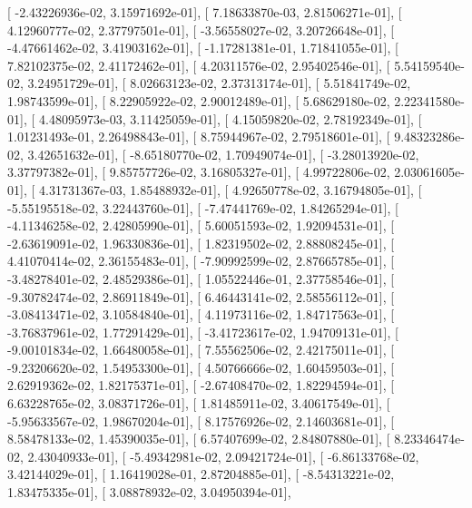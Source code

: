 \documentclass{article}
\begin{document}
       [ -2.43226936e-02,   3.15971692e-01],
       [  7.18633870e-03,   2.81506271e-01],
       [  4.12960777e-02,   2.37797501e-01],
       [ -3.56558027e-02,   3.20726648e-01],
       [ -4.47661462e-02,   3.41903162e-01],
       [ -1.17281381e-01,   1.71841055e-01],
       [  7.82102375e-02,   2.41172462e-01],
       [  4.20311576e-02,   2.95402546e-01],
       [  5.54159540e-02,   3.24951729e-01],
       [  8.02663123e-02,   2.37313174e-01],
       [  5.51841749e-02,   1.98743599e-01],
       [  8.22905922e-02,   2.90012489e-01],
       [  5.68629180e-02,   2.22341580e-01],
       [  4.48095973e-03,   3.11425059e-01],
       [  4.15059820e-02,   2.78192349e-01],
       [  1.01231493e-01,   2.26498843e-01],
       [  8.75944967e-02,   2.79518601e-01],
       [  9.48323286e-02,   3.42651632e-01],
       [ -8.65180770e-02,   1.70949074e-01],
       [ -3.28013920e-02,   3.37797382e-01],
       [  9.85757726e-02,   3.16805327e-01],
       [  4.99722806e-02,   2.03061605e-01],
       [  4.31731367e-03,   1.85488932e-01],
       [  4.92650778e-02,   3.16794805e-01],
       [ -5.55195518e-02,   3.22443760e-01],
       [ -7.47441769e-02,   1.84265294e-01],
       [ -4.11346258e-02,   2.42805990e-01],
       [  5.60051593e-02,   1.92094531e-01],
       [ -2.63619091e-02,   1.96330836e-01],
       [  1.82319502e-02,   2.88808245e-01],
       [  4.41070414e-02,   2.36155483e-01],
       [ -7.90992599e-02,   2.87665785e-01],
       [ -3.48278401e-02,   2.48529386e-01],
       [  1.05522446e-01,   2.37758546e-01],
       [ -9.30782474e-02,   2.86911849e-01],
       [  6.46443141e-02,   2.58556112e-01],
       [ -3.08413471e-02,   3.10584840e-01],
       [  4.11973116e-02,   1.84717563e-01],
       [ -3.76837961e-02,   1.77291429e-01],
       [ -3.41723617e-02,   1.94709131e-01],
       [ -9.00101834e-02,   1.66480058e-01],
       [  7.55562506e-02,   2.42175011e-01],
       [ -9.23206620e-02,   1.54953300e-01],
       [  4.50766666e-02,   1.60459503e-01],
       [  2.62919362e-02,   1.82175371e-01],
       [ -2.67408470e-02,   1.82294594e-01],
       [  6.63228765e-02,   3.08371726e-01],
       [  1.81485911e-02,   3.40617549e-01],
       [ -5.95633567e-02,   1.98670204e-01],
       [  8.17576926e-02,   2.14603681e-01],
       [  8.58478133e-02,   1.45390035e-01],
       [  6.57407699e-02,   2.84807880e-01],
       [  8.23346474e-02,   2.43040933e-01],
       [ -5.49342981e-02,   2.09421724e-01],
       [ -6.86133768e-02,   3.42144029e-01],
       [  1.16419028e-01,   2.87204885e-01],
       [ -8.54313221e-02,   1.83475335e-01],
       [  3.08878932e-02,   3.04950394e-01],
\end{document}
